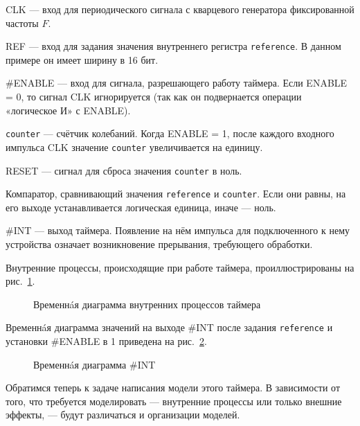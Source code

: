 \begin{itemize*}
    \item CLK — вход для периодического сигнала с кварцевого генератора фиксированной частоты $F$. %
    \item REF — вход для задания значения внутреннего регистра \texttt{reference}. В данном примере он имеет ширину в 16 бит.
    \item \#ENABLE — вход для сигнала, разрешающего работу таймера. Если ENABLE = 0, то сигнал CLK игнорируется (так как он подвернается операции «логическое И» с ENABLE).
    \item \texttt{counter} — счётчик колебаний. Когда ENABLE = 1, после каждого входного импульса CLK значение \texttt{counter} увеличивается на единицу.
    \item RESET — сигнал для сброса значения \texttt{counter} в ноль.
    \item Компаратор, сравнивающий значения \texttt{reference} и \texttt{counter}. Если они равны, на его выходе устанавливается логическая единица, иначе — ноль.
    \item \#INT — выход таймера. Появление на нём импульса для подключенного к нему устройства означает возникновение прерывания, требующего обработки.
\end{itemize*}

Внутренние процессы, происходящие при работе таймера, проиллюстрированы на рис. \ref{fig:counter-diagram}.

\begin{figure}[htp]
    \centering
    \caption[Временнáя диаграмма внутренних процессов]{Временнáя диаграмма внутренних процессов таймера}
    \label{fig:counter-diagram}
\end{figure}

Временнáя диаграмма значений на выходе \#INT после задания \texttt{reference} и установки \#ENABLE в 1 приведена на рис. \ref{fig:timer-diagram}.

\begin{figure}[htp]
    \centering
    \caption[Временнáя диаграмма \#INT]{Временнáя диаграмма \#INT}
    \label{fig:timer-diagram}
\end{figure}

Обратимся теперь к задаче написания модели этого таймера. В зависимости от того, что требуется моделировать — внутренние процессы или только внешние эффекты, — будут различаться и организации моделей.

